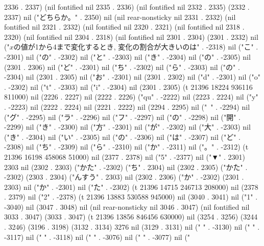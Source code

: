 2336 . 2337) (nil fontified nil 2335 . 2336) (nil fontified nil 2332 . 2335) (2332 . 2337) nil ("どちらか。" . 2350) nil (nil rear-nonsticky nil 2331 . 2332) (nil fontified nil 2321 . 2332) (nil fontified nil 2320 . 2321) (nil fontified nil 2318 . 2320) (nil fontified nil 2304 . 2318) (nil fontified nil 2301 . 2304) (2301 . 2332) nil ("$x$の値が1から4まで変化するとき, 変化の割合が大きいのは" . -2318) nil ("こ" . -2301) nil ("の" . -2302) nil ("と" . -2303) nil ("き" . -2304) nil ("の" . -2305) nil (2301 . 2306) nil ("ど" . -2301) nil ("ち" . -2302) nil ("ら" . -2303) nil ("の" . -2304) nil (2301 . 2305) nil ("お" . -2301) nil (2301 . 2302) nil ("d" . -2301) nil ("o" . -2302) nil ("t" . -2303) nil ("i" . -2304) nil (2301 . 2305) (t 21396 18224 936116 811000) nil (2226 . 2227) nil (2222 . 2226) ("qu" . -2222) nil (2223 . 2224) nil ("y" . -2223) nil (2222 . 2224) nil (2221 . 2222) nil (2294 . 2295) nil ("~" . -2294) nil ("グ" . -2295) nil ("ラ" . -2296) nil ("フ" . -2297) nil ("の" . -2298) nil ("開" . -2299) nil ("き" . -2300) nil ("方" . -2301) nil ("が" . -2302) nil ("大" . -2303) nil ("き" . -2304) nil ("い" . -2305) nil ("の" . -2306) nil ("は" . -2307) nil ("ど" . -2308) nil ("ち" . -2309) nil ("ら" . -2310) nil ("か" . -2311) nil ("。" . -2312) (t 21396 16198 458068 51000) nil (2377 . 2378) nil ("5" . -2377) nil ("▼" . 2301) 2303 nil (2302 . 2303) ("かた" . -2302) ("ち" . 2304) nil (2302 . 2305) ("かた" . -2302) (2303 . 2304) ("んすう" . 2303) nil (2302 . 2306) ("か" . -2302) (2301 . 2303) nil ("か" . -2301) nil ("た" . -2302) (t 21396 14715 246713 208000) nil (2378 . 2379) nil ("2" . -2378) (t 21396 13883 530588 945000) nil (3040 . 3041) nil ("1" . -3040) nil (3047 . 3048) nil (nil rear-nonsticky nil 3046 . 3047) (nil fontified nil 3033 . 3047) (3033 . 3047) (t 21396 13856 846456 630000) nil (3254 . 3256) (3244 . 3246) (3196 . 3198) (3132 . 3134) 3276 nil (3129 . 3131) nil (" " . -3130) nil (" " . -3117) nil (" " . -3118) nil (" " . -3076) nil (" " . -3077) nil ("%